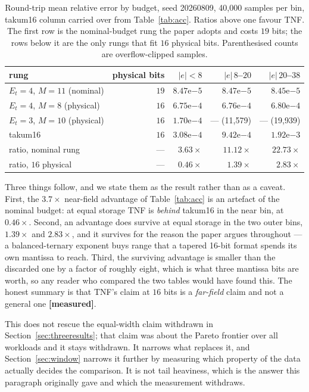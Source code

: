 \documentclass[11pt]{article}
\theoremstyle{definition}
\begin{document}
\begin{table}[t]\centering
\caption{Round-trip mean relative error by budget, seed 20260809, 40{,}000 samples
per bin, takum16 column carried over from Table~\ref{tab:acc}. Ratios above one
favour TNF. The first row is the nominal-budget rung the paper adopts and costs
$19$ bits; the rows below it are the only rungs that fit $16$ physical bits.
Parenthesised counts are overflow-clipped samples.}
\label{tab:accphys}
\small
\begin{tabular}{lrrrr}
\toprule
rung & physical bits & $|e|<8$ & $|e|\,8$--$20$ & $|e|\,20$--$38$ \\
\midrule
$E_t{=}4$, $M{=}11$ (nominal)   & $19$ & $8.47\mathrm{e}{-5}$ & $8.47\mathrm{e}{-5}$ & $8.45\mathrm{e}{-5}$ \\
$E_t{=}4$, $M{=}8$  (physical)  & $16$ & $6.75\mathrm{e}{-4}$ & $6.76\mathrm{e}{-4}$ & $6.80\mathrm{e}{-4}$ \\
$E_t{=}3$, $M{=}10$ (physical)  & $16$ & $1.70\mathrm{e}{-4}$ & --- (11{,}579) & --- (19{,}939) \\
takum16                         & $16$ & $3.08\mathrm{e}{-4}$ & $9.42\mathrm{e}{-4}$ & $1.92\mathrm{e}{-3}$ \\
\midrule
ratio, nominal rung  & --- & $\mathbf{3.63\times}$ & $\mathbf{11.12\times}$ & $\mathbf{22.73\times}$ \\
ratio, $16$ physical & --- & $0.46\times$ & $1.39\times$ & $2.83\times$ \\
\bottomrule
\end{tabular}
\end{table}

Three things follow, and we state them as the result rather than as a caveat.
First, the $3.7\times$ near-field advantage of Table~\ref{tab:acc} is an artefact
of the nominal budget: at equal storage TNF is \emph{behind} takum16 in the near
bin, at $0.46\times$. Second, an advantage does survive at equal storage in the two
outer bins, $1.39\times$ and $2.83\times$, and it survives for the reason the paper
argues throughout --- a balanced-ternary exponent buys range that a tapered
16-bit format spends its own mantissa to reach. Third, the surviving advantage is
smaller than the discarded one by a factor of roughly eight, which is what three
mantissa bits are worth, so any reader who compared the two tables would have
found this. The honest summary is that TNF's claim at $16$ bits is a
\emph{far-field} claim and not a general one \textbf{[measured]}.

This does not rescue the equal-width claim withdrawn in Section~\ref{sec:threeresults};
that claim was about the Pareto frontier over all workloads and it stays withdrawn.
It narrows what replaces it, and Section~\ref{sec:window} narrows it further by
measuring which property of the data actually decides the comparison. It is not
tail heaviness, which is the answer this paragraph originally gave and which the
measurement withdraws.
\end{document}
